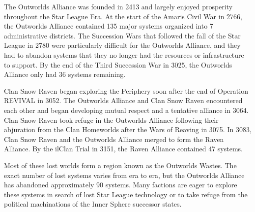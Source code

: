 The Outworlds Alliance was founded in 2413 and largely enjoyed prosperity throughout the Star League Era.
At the start of the Amaris Civil War in 2766, the Outworlds Alliance contained 135 major systems organized into 7 administrative districts.
The Succession Wars that followed the fall of the Star League in 2780 were particularly difficult for the Outworlds Alliance, and they had to abandon systems that they no longer had the resources or infrastructure to support.
By the end of the Third Succession War in 3025, the Outworlds Alliance only had 36 systems remaining.

Clan Snow Raven began exploring the Periphery soon after the end of Operation REVIVAL in 3052.
The Outworlds Alliance  and Clan Snow Raven encountered each other and began developing mutual respect and a tentative alliance in 3064.
Clan Snow Raven took refuge in the Outworlds Alliance following their abjuration from the Clan Homeworlds after the Wars of Reaving in 3075.
In 3083, Clan Snow Raven and the Outworlds Alliance merged to form the Raven Alliance.
By the ilClan Trial in 3151, the Raven Alliance contained 47 systems.

Most of these lost worlds form a region known as the Outworlds Wastes.
The exact number of lost systems varies from era to era, but the Outworlds Alliance has abandoned approximately 90 systems.
Many factions are eager to explore these systems in search of lost Star League technology or to take refuge from the political machinations of the Inner Sphere successor states.
